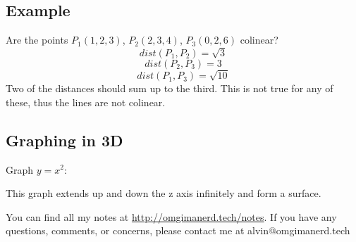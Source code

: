 \documentclass[letterpaper, 12pt]{math}
\begin{document}
\subsection*{Example}
Are the points \( P_{1}(1,2,3) \), \( P_{2}(2,3,4) \), \( P_{3}(0,2,6) \)
colinear?
\[ dist(P_{1},P_{2}) = \sqrt{3} \]
\[ dist(P_{2},P_{3}) = 3 \]
\[ dist(P_{1},P_{3}) = \sqrt{10} \]
Two of the distances should sum up to the third. This is not true for any of
these, thus the lines are not colinear.

\subsection*{Graphing in 3D}
Graph \( y = x^{2} \):
\begin{center}
\end{center}
This graph extends up and down the z axis infinitely and form a surface.

\begin{center}
  You can find all my notes at \url{http://omgimanerd.tech/notes}. If you have
  any questions, comments, or concerns, please contact me at
  alvin@omgimanerd.tech
\end{center}
\end{document}
